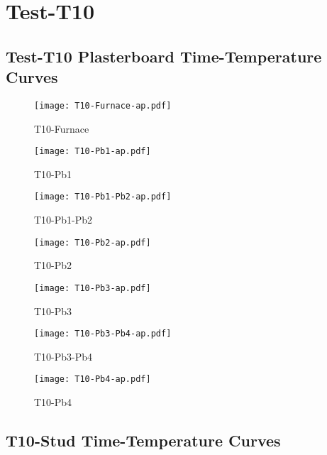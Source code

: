 \pagebreak

\section*{Test-T10}
\subsection*{Test-T10 Plasterboard Time-Temperature Curves}

\begin{figure}[htbp]
\centering
	\texttt{[image: T10-Furnace-ap.pdf]}
	\caption*{T10-Furnace}
\end{figure}
\begin{figure}[htbp]
	\centering
		\texttt{[image: T10-Pb1-ap.pdf]}
		\caption*{T10-Pb1}
\end{figure}
\begin{figure}[htbp]
	\centering
		\texttt{[image: T10-Pb1-Pb2-ap.pdf]}
		\caption*{T10-Pb1-Pb2}
\end{figure}
\begin{figure}[htbp]
	\centering
		\texttt{[image: T10-Pb2-ap.pdf]}
		\caption*{T10-Pb2}
\end{figure}
\begin{figure}[htbp]
	\centering
		\texttt{[image: T10-Pb3-ap.pdf]}
		\caption*{T10-Pb3}
\end{figure}
\begin{figure}[htbp]
	\centering
			\texttt{[image: T10-Pb3-Pb4-ap.pdf]}
			\caption*{T10-Pb3-Pb4}
\end{figure}
\begin{figure}[htbp]
	\centering
			\texttt{[image: T10-Pb4-ap.pdf]}
			\caption*{T10-Pb4}
\end{figure}

\pagebreak

\subsection*{T10-Stud Time-Temperature Curves}

